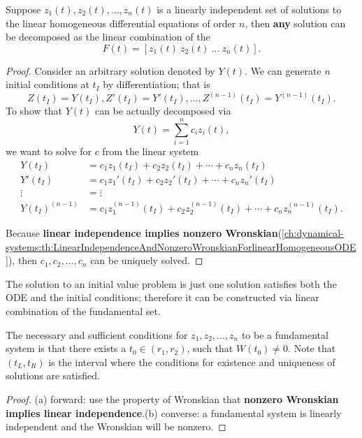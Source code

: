 \begin{refsection}
\begin{theorem}
Suppose $z_1(t),z_2(t),...,z_n(t)$ is a linearly independent set of solutions to the linear homogeneous differential equations of order $n$, then \textbf{any} solution can be decomposed as the linear combination of the $$F(t) = [z_1(t)~z_2(t)~...~z_n(t)].$$ 
\end{theorem}
\begin{proof}	
Consider an arbitrary solution denoted by $Y(t)$. We can generate $n$ initial conditions at $t_I$ by differentiation; that is
$$Z(t_I) = Y(t_I),Z'(t_I) = Y'(t_I),...,Z^{(n-1)}(t_I) = Y^{(n-1)}(t_I).$$
To show that $Y(t)$ can be actually decomposed via
$$Y(t) = \sum_{i=1}^{n} c_i z_i(t),$$
we want to solve for $c$ from the linear system
	\begin{align*}
Y(t_I) &= c_1z_1(t_I) + c_2z_2(t_I) + \cdots + c_nz_n(t_I) \\
Y'(t_I) &= c_1z_1'(t_I) + c_2z_2'(t_I) + \cdots + c_nz_n'(t_I) \\
\vdots &= \vdots\\
Y(t_I)^{(n-1)} &= c_1z_1^{(n-1)}(t_I) + c_2z_2^{(n-1)}(t_I) + \cdots + c_nz_n^{(n-1)}(t_I). 
\end{align*}

Because \textbf{linear independence implies nonzero  Wronskian}(\autoref{ch:dynamical-systems:th:LinearIndependenceAndNonzeroWronskianForlinearHomogeneousODE}), then $c_1,c_2,...,c_n$ can be uniquely solved.	
\end{proof}


\begin{remark}
	The solution to an initial value problem is just one solution satisfies both the ODE and the initial conditions; therefore it can be constructed via linear combination of the fundamental set. 
\end{remark}

\begin{theorem}The necessary and sufficient conditions for $z_1,z_2,...,z_n$ to be a fundamental system is
	that there exists a $t_0 \in (r_1,r_2)$, such that $W(t_0)\neq 0$.
	Note that $(t_L,t_R)$ is the interval where the conditions for existence and uniqueness of solutions are satisfied. 
\end{theorem}
\begin{proof}
(a) forward: use the property of Wronskian that \textbf{ nonzero Wronskian implies linear independence}.(b) converse: a fundamental system is linearly independent and the Wronskian will be nonzero.
\end{proof}


\end{refsection}
